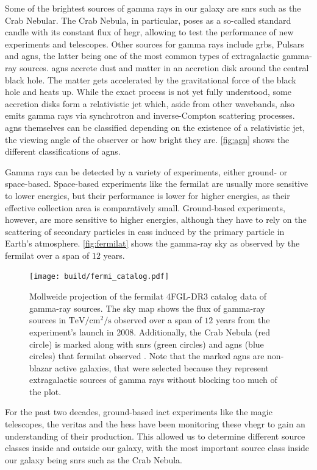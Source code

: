 Some of the brightest sources of gamma rays in our galaxy are \glspl{snr} such as the Crab Nebular.
The Crab Nebula, in particular, poses as a so-called standard candle with its constant flux of
\gls{hegr}, allowing to test the performance of new experiments and telescopes. Other sources for
gamma rays include \glspl{grb}, Pulsars and \glspl{agn}, the latter being one of the most common types
of extragalactic gamma-ray sources. \glspl{agn} accrete dust and matter in an accretion disk around the
central black hole. The matter gets accelerated by the gravitational force of the black hole and heats
up. While the exact process is not yet fully understood, some accretion disks form a relativistic jet
which, aside from other wavebands, also emits gamma rays via synchrotron
and inverse-Compton scattering processes. \glspl{agn} themselves can be classified depending on the existence
of a relativistic jet, the viewing angle of the observer or how bright they are. \autoref{fig:agn}
shows the different classifications of \glspl{agn}.

Gamma rays can be detected by a variety of experiments, either ground- or space-based. Space-based
experiments like the \gls{fermilat} are usually more sensitive to lower energies, but their performance
is lower for higher energies, as their effective collection area is comparatively small. Ground-based
experiments, however, are more sensitive to higher energies, although they have to rely on the scattering
of secondary particles in \glspl{eas} induced by the primary particle in Earth's atmosphere.
\autoref{fig:fermilat} shows the gamma-ray sky as observed by the \gls{fermilat} over a span of
\(\num{12}\) years.

\begin{figure}
    \centering
    \texttt{[image: build/fermi\_catalog.pdf]}
    \caption{Mollweide projection of the \gls{fermilat} 4FGL-DR3 catalog data of gamma-ray sources. The sky map
    shows the flux of gamma-ray sources in \(\si{\tera\eV\per\centi\meter\squared\per\second}\)
    observed over a span of \(\num{12}\) years from the experiment's launch in 2008. Additionally,
    the Crab Nebula (red circle) is marked along with \glspl{snr} (green circles) and \glspl{agn} (blue circles) that \gls{fermilat}
    observed \cite{fermi4fgl, fermi4fgldr3}. Note that the marked \glspl{agn} are non-blazar active galaxies, that were
    selected because they represent extragalactic sources of gamma rays without blocking too much of the plot.}
    \label{fig:fermilat}
\end{figure}

For the past two decades, ground-based \gls{iact} experiments like the \gls{magic} telescopes, the
\gls{veritas} and the \gls{hess} have been monitoring these \gls{vhegr} to gain an understanding of
their production. This allowed us to determine different source classes inside and outside our galaxy,
with the most important source class inside our galaxy being \glspl{snr} such as the Crab Nebula.





